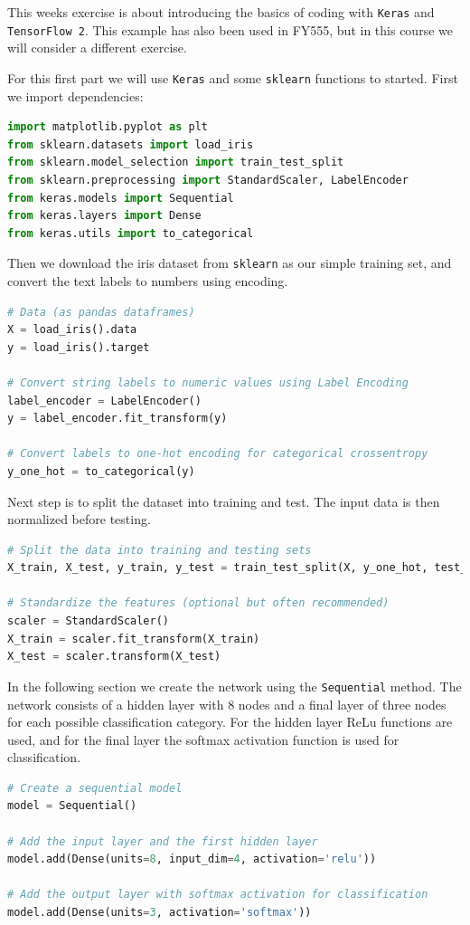 \documentclass[12pt,a4paper]{article} %
\numberwithin{equation}{section}
\begin{document}
			This weeks exercise is about introducing the basics of coding with \texttt{Keras} and \texttt{TensorFlow 2}. This example has also been used in FY555, but in this course we will consider a different exercise.
			
			For this first part we will use \texttt{Keras} and some \texttt{sklearn} functions to started. First we import dependencies:			
			\begin{lstlisting}[language=Python]
import matplotlib.pyplot as plt
from sklearn.datasets import load_iris
from sklearn.model_selection import train_test_split
from sklearn.preprocessing import StandardScaler, LabelEncoder
from keras.models import Sequential
from keras.layers import Dense
from keras.utils import to_categorical
			\end{lstlisting}
			Then we download the iris dataset from \texttt{sklearn} as our simple training set, and convert the text labels to numbers using encoding.
			\begin{lstlisting}[language=Python]
# Data (as pandas dataframes)
X = load_iris().data
y = load_iris().target

# Convert string labels to numeric values using Label Encoding
label_encoder = LabelEncoder()
y = label_encoder.fit_transform(y)

# Convert labels to one-hot encoding for categorical crossentropy
y_one_hot = to_categorical(y)
			\end{lstlisting}
			Next step is to split the dataset into training and test. The input data is then normalized before testing.
			\begin{lstlisting}[language=Python]
# Split the data into training and testing sets
X_train, X_test, y_train, y_test = train_test_split(X, y_one_hot, test_size=0.2, random_state=42)

# Standardize the features (optional but often recommended)
scaler = StandardScaler()
X_train = scaler.fit_transform(X_train)
X_test = scaler.transform(X_test)
			\end{lstlisting}
			In the following section we create the network using the \texttt{Sequential} method. The network consists of a hidden layer with 8 nodes and a final layer of three nodes for each possible classification category. For the hidden layer ReLu functions are used, and for the final layer the softmax activation function is used for classification.
			\begin{lstlisting}[language=Python]
# Create a sequential model
model = Sequential()

# Add the input layer and the first hidden layer
model.add(Dense(units=8, input_dim=4, activation='relu'))

# Add the output layer with softmax activation for classification
model.add(Dense(units=3, activation='softmax'))
			\end{lstlisting}
\end{document}

